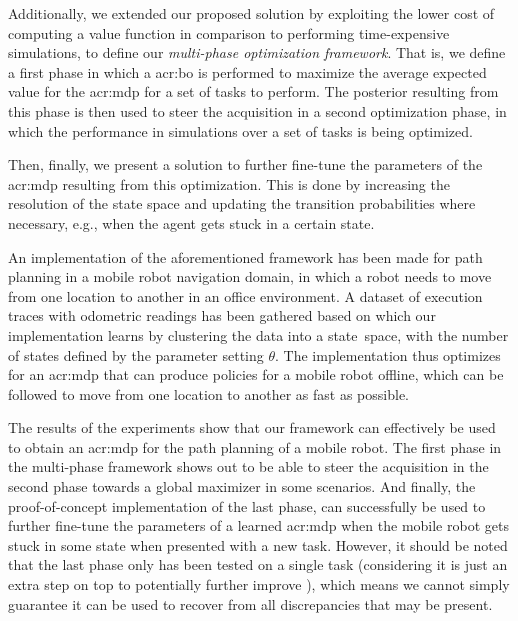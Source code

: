 Additionally, we extended our proposed solution by exploiting the lower cost of computing a value function in comparison to performing time-expensive simulations, to define our \textit{multi-phase optimization framework}.
That is, we define a first phase in which a \acrshort{acr:bo} is performed to maximize the average expected value for the \acrshort{acr:mdp} for a set of tasks to perform.
The posterior resulting from this phase is then used to steer the acquisition in a second optimization phase, in which the performance in simulations over a set of tasks is being optimized.

Then, finally, we present a solution to further fine-tune the parameters of the \acrshort{acr:mdp} resulting from this optimization.
This is done by increasing the resolution of the state space and updating the transition probabilities where necessary, e.g., when the agent gets stuck in a certain state.

An implementation of the aforementioned framework has been made for path planning in a mobile robot navigation domain, in which a robot needs to move from one location to another in an office environment.
A dataset of execution traces with odometric readings has been gathered based on which our implementation learns  by clustering the data into a state~space, with the number of states defined by the parameter setting $\theta$.
The implementation thus optimizes for an \acrshort{acr:mdp} that can produce policies for a mobile robot offline, which can be followed to move from one location to another as fast as possible.

The results of the experiments show that our framework can effectively be used to obtain an \acrshort{acr:mdp} for the path planning of a mobile robot.
The first phase in the multi-phase framework shows out to be able to steer the acquisition in the second phase towards a global maximizer in some scenarios.
And finally, the proof-of-concept implementation of the last phase, can successfully be used to further fine-tune the parameters of a learned \acrshort{acr:mdp} when the mobile robot gets stuck in some state when presented with a new task.
However, it should be noted that the last phase only has been tested on a single task (considering it is just an extra step on top to potentially further improve ), which means we cannot simply guarantee it can be used to recover from all discrepancies that may be present.


